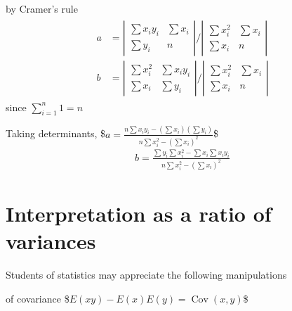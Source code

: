 \documentclass[letterpaper,10pt,english]{jupyterBook}
\begin{document}
\sphinxAtStartPar
by Cramer’s rule
\begin{equation*}
\begin{split}
\begin{aligned}
a & =\left|\begin{array}{ll}
\sum x_{i} y_{i} & \sum x_{i} \\
\sum y_{i} & n
\end{array}\right| /\left|\begin{array}{ll}
\sum x_{i}^{2} & \sum x_{i} \\
\sum x_{i} & n
\end{array}\right| \\
b & =\left|\begin{array}{ll}
\sum x_{i}^{2} & \sum x_{i} y_{i} \\
\sum x_{i} & \sum y_{i}
\end{array}\right| /\left|\begin{array}{ll}
\sum x_{i}^{2} & \sum x_{i} \\
\sum x_{i} & n
\end{array}\right|
\end{aligned}
\end{split}
\end{equation*}
\sphinxAtStartPar
since \(\sum_{i=1}^{n} 1=n\)

\sphinxAtStartPar
Taking determinants,
\$\(a=\frac{n \sum x_{i} y_{i}-\left(\sum x_{i}\right)\left(\sum y_{i}\right)}{n \sum x_{i}^{2}-\left(\sum x_{i}\right)^{2}}\)\$
\begin{equation*}
\begin{split}
b=\frac{\sum y_{i} \sum x_{i}^{2}-\sum x_{i} \sum x_{i} y_{i}}{n \sum x_{i}^{2}-\left(\sum x_{i}\right)^{2}}
\end{split}
\end{equation*}

\section{Interpretation as a ratio of variances}
\label{\detokenize{lessons/Linear_regression_derivation:interpretation-as-a-ratio-of-variances}}
\sphinxAtStartPar
Students of statistics may appreciate the following manipulations

\sphinxAtStartPar
{} of covariance
\$\(E(x y)-E(x) E(y)=\operatorname{Cov}(x, y)\)\$
\end{document}
